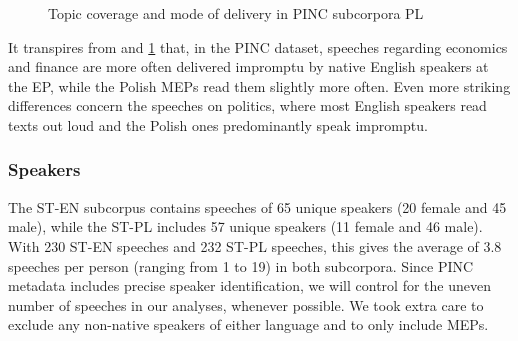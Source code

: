 \documentclass[output=paper]{langscibook}
\begin{document}
\begin{figure}
\caption{Topic coverage and mode of delivery in PINC subcorpora PL}
\label{fig:chmiel:1b}
\end{figure}

It transpires from  and \ref{fig:chmiel:1b} that, in the PINC dataset, speeches regarding economics and finance are more often delivered impromptu by native English speakers at the EP, while the Polish MEPs read them slightly more often. Even more striking differences concern the speeches on politics, where most English speakers read texts out loud and the Polish ones predominantly speak impromptu.

\subsubsection{Speakers} \label{sec:chmiel:2.1.3}

The ST-EN subcorpus contains speeches of 65 unique speakers (20 female and 45 male), while the ST-PL includes 57 unique speakers (11 female and 46 male). With 230 ST-EN speeches and 232 ST-PL speeches, this gives the average of 3.8 speeches per person (ranging from 1 to 19) in both subcorpora. Since PINC metadata includes precise speaker identification, we will control for the uneven number of speeches in our analyses, whenever possible. We took extra care to exclude any non-native speakers of either language and to only include MEPs. 
\end{document}
